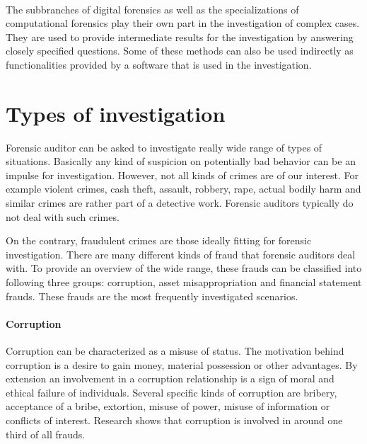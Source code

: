 


\paragraph{} The subbranches of digital forensics as well as the specializations of computational forensics play their own part in the investigation of complex cases. They are used to provide intermediate results for the investigation by answering closely specified questions. Some of these methods can also be used indirectly as functionalities provided by a software that is used in the investigation.  




\section{Types of investigation}

Forensic auditor can be asked to investigate really wide range of types of situations. Basically any kind of suspicion on potentially bad behavior can be an impulse for investigation. However, not all kinds of crimes are of our interest. For example violent crimes, cash theft, assault, robbery, rape, actual bodily harm and similar crimes are rather part of a detective work. Forensic auditors typically do not deal with such crimes. 

On the contrary, fraudulent crimes are those ideally fitting for forensic investigation. There are many different kinds of fraud that forensic auditors deal with. To provide an overview of the wide range, these frauds can be classified into following three groups: corruption, asset misappropriation and financial statement frauds. These frauds are the most frequently investigated scenarios.

\paragraph {Corruption}
Corruption can be characterized as a misuse of status. The motivation behind corruption is a desire to gain money, material possession or other advantages. By extension an involvement in a corruption relationship is a sign of moral and ethical failure of individuals. Several specific kinds of corruption are bribery, acceptance of a bribe, extortion, misuse of power, misuse of information or conflicts of interest. Research shows that corruption is involved in around one third of all frauds. \cite{weaver}

